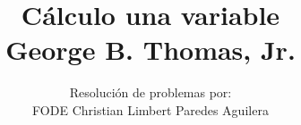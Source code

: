 \normalfont

\author{\Large Resolución de problemas por: \\ FODE \small Christian Limbert Paredes Aguilera}
\title{Cálculo una variable \\ \small George B. Thomas, Jr.}
\date{}
\pagestyle{empty}
\maketitle
\thispagestyle{empty}
\let\cleardoublepage\clearpage
\tableofcontents								%


 
\let\cleardoublepage\clearpage
